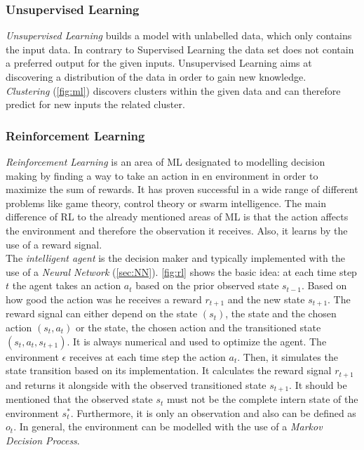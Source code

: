 \subsubsection{Unsupervised Learning}
\emph{Unsupervised Learning} builds a model with unlabelled data, which only contains the input data. In contrary to Supervised Learning the data set does not contain a preferred output for the given inputs. Unsupervised Learning aims at discovering a distribution of the data in order to gain new knowledge.\\
\emph{Clustering} (\cref{fig:ml}) discovers clusters within the given data and can therefore predict for new inputs the related cluster.

\subsubsection{Reinforcement Learning}
\emph{Reinforcement Learning} is an area of ML designated to modelling decision making by finding a way to take an action in en environment in order to maximize the sum of rewards. It has proven successful in a wide range of different problems like game theory, control theory or swarm intelligence. 
The main difference of RL to the already mentioned areas of ML is that the action affects the environment and therefore the observation it receives. Also, it learns by the use of a reward signal.\\
The \emph{intelligent agent} is the decision maker and typically implemented with the use of a \emph{Neural Network} (\cref{sec:NN}). \cref{fig:rl} shows the basic idea: at each time step $t$ the agent takes an action $a_t$ based on the prior observed state $s_{t-1}$. Based on how good the action was he receives a reward $r_{t+1}$ and the new state $s_{t+1}$.
The reward signal can either depend on the state $(s_t)$, the state and the chosen action $(s_t, a_t)$ or the state, the chosen action and the transitioned state $(s_t, a_t, s_{t+1})$. It is always numerical and used to optimize the agent.
The environment $\epsilon$ receives at each time step the action $a_t$. Then, it simulates the state transition based on its implementation. It calculates the reward signal $r_{t+1}$ and returns it alongside with the observed transitioned state $s_{t+1}$. It should be mentioned that the observed state $s_t$ must not be the complete intern state of the environment $s_t^*$. Furthermore, it is only an observation and also can be defined as $o_t$.  
In general, the environment can be modelled with the use of a \emph{Markov Decision Process}.

